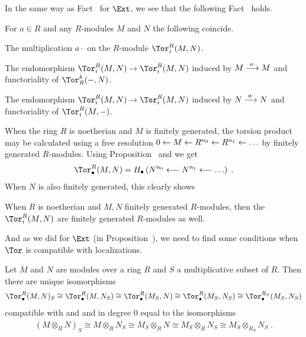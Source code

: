 \documentclass[a4paper,parskip=half,numbers=enddot, DIV=12]{scrreprt}
\begin{document}
In the same way as Fact~ for $\Ext$, we see that the following Fact~ holds.
\begin{fact}
	For $a\in R$ and any $R$-modules $M$ and $N$ the following coincide.
	\begin{alphanumerate}
		\item The multiplication $a\cdot $ on the $R$-module $\Tor_i^R(M,N)$.
		\item The endomorphism $\Tor_i^R(M,N)\morphism\Tor_i^R(M,N)$ induced by $M\morphism[a\cdot ]M$ and functoriality of $\Tor_R^k(-,N)$.
		\item The endomorphism $\Tor_i^R(M,N)\morphism\Tor_i^R(M,N)$ induced by $N\morphism[a\cdot ]N$ and functoriality of $\Tor_i^R(M,-)$.
	\end{alphanumerate}
\end{fact}
When the ring $R$ is noetherian and $M$ is finitely generated, the torsion product may be calculated using a free resolution $0\lmorphism M\lmorphism R^{n_0}\lmorphism R^{n_1}\lmorphism\ldots$ by finitely generated $R$-modules. Using Proposition~ and  we get
\begin{align*}
	\Tor_\bullet^R(M,N)=H_\bullet\left(N^{n_0}\lmorphism N^{n_1}\lmorphism\ldots\right)\;.
\end{align*}
When $N$ is also finitely generated, this clearly shows
\begin{fact}
	When $R$ is noetherian  and $M,N$ finitely generated $R$-modules, then the $\Tor_i^R(M,N)$ are finitely generated $R$-modules as well.
\end{fact}
And as we did for $\Ext$ (in Proposition~), we need to find some conditions when $\Tor$ is compatible with localizations.
\begin{fact}
	Let $M$ and $N$ are modules over a ring $R$ and $S$ a multiplicative subset of $R$. Then there are unique isomorphisms
	\begin{align*}
		\Tor_\bullet^R(M,N)_S\cong \Tor_\bullet^R(M,N_S)\cong \Tor_\bullet^R(M_S,N)\cong \Tor_\bullet^R(M_S,N_S)\cong \Tor_\bullet^{R_S}(M_S,N_S)
	\end{align*}
	compatible with  and  and in degree $0$ equal to the isomorphisms
	\begin{align*}
		(M\otimes _RN)_S\cong M\otimes _RN_S\cong M_S\otimes _RN\cong M_S\otimes _RN_S\cong {M_S}\otimes _{R_S}N_S\;.
	\end{align*}
\end{fact}
\end{document}
